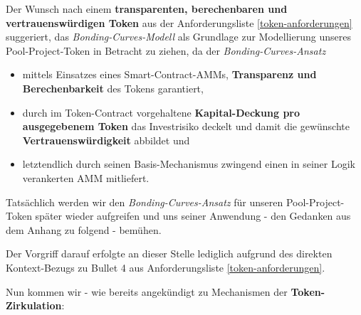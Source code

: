 \begin{Konzept}
\vspace{0.2cm}

Der Wunsch nach einem \textbf{transparenten, berechenbaren und vertrauenswürdig\-en Token} aus der Anforderungsliste \ref{token-anforderungen} suggeriert, das \textit{Bonding-Curves-Modell} als Grundlage zur Modellierung unseres Pool-Project-Token in Betracht zu ziehen, da der \textit{Bonding-Curves-Ansatz}

\begin{itemize}
	\item mittels Einsatzes eines Smart-Contract-AMMs, \textbf{Transparenz und Berechenbarkeit} des Tokens garantiert,
	\item durch im Token-Contract vorgehaltene \textbf{Kapital-Deckung pro ausgegebenem Token} das Investrisiko deckelt und damit die gewünschte \textbf{Vertrauenswürdig\-keit} abbildet und
	\item letztendlich durch seinen Basis-Mechanismus zwingend einen in seiner Logik verankerten AMM mitliefert.
\end{itemize}

\vspace{0.3cm}


\vspace{0.5cm}

Tatsächlich werden wir den \textit{Bonding-Curves-Ansatz} für unseren Pool-Project-Token später wieder aufgreifen und uns seiner Anwendung - den Gedanken aus dem Anhang zu  folgend - bemühen.

\vspace{0.3cm}

Der Vorgriff darauf erfolgte an dieser Stelle lediglich aufgrund des direkten Kontext-Bezugs zu Bullet 4 aus Anforderungsliste \ref{token-anforderungen}.

\end{Konzept}

\newpage


Nun kommen wir - wie bereits angekündigt zu Mechanismen der \textbf{Token-Zirkulation}:

\vspace{0.3cm}


